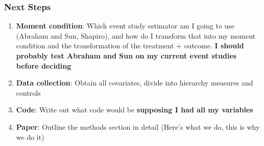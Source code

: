 \documentclass[source/paper/main.tex]{subfiles}
\begin{document}
\subsubsection{Next Steps}
\begin{enumerate}
    \item \textbf{Moment condition}: Which event study estimator am I going to use (Abraham and Sun, Shapiro), and how do I transform that into my moment condition and the transformation of the treatment + outcome. \textbf{I should probably test Abraham and Sun on my current event studies before deciding}
    \item \textbf{Data collection}: Obtain all covariates, divide into hierarchy measures and controls
    \item \textbf{Code}: Write out what code would be \textbf{supposing I had all my variables}
    \item \textbf{Paper}: Outline the methods section in detail (Here's what we do, this is why we do it)
\end{enumerate}
\end{document}

